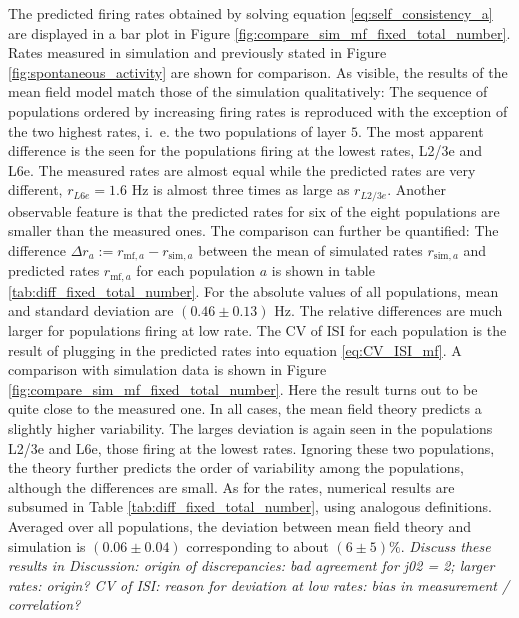 The predicted firing rates obtained by solving equation 
\eqref{eq:self_consistency_a} are displayed in a bar plot in Figure 
\ref{fig:compare_sim_mf_fixed_total_number}. Rates measured in 
simulation and previously stated in Figure \ref{fig:spontaneous_activity}
are shown for comparison. As visible, the results of the mean field model 
match those of the simulation qualitatively: The sequence of populations 
ordered by increasing firing rates is reproduced with the exception of
the two highest rates, i.~e. the two populations of layer $5$. 
The most apparent difference is the seen for the populations firing at the lowest 
rates, L2/3e  and L6e. The measured rates are almost equal while the 
predicted rates are very different, $r_{L6e} = 1.6$ Hz is almost three times 
as large as $r_{L2/3e}$. Another observable feature is that the predicted rates
for six of the eight populations are smaller than the measured ones. 
The comparison can further be quantified: The difference 
$    \Delta r_a := r_{\text{mf}, a} - r_{\text{sim}, a} $
between the mean of simulated rates $r_{\text{sim}, a}$ and predicted rates 
$r_{\text{mf}, a}$ for each population $a$ is shown in table \ref{tab:diff_fixed_total_number}. 
For the absolute values of all populations, mean and standard 
deviation are $(0.46 \pm  0.13)$ Hz. The relative differences 
are much larger for populations firing at low rate.  
The CV of ISI for each population is the result of plugging in the predicted rates 
into equation \eqref{eq:CV_ISI_mf}. A comparison with simulation data is shown
in Figure \ref{fig:compare_sim_mf_fixed_total_number}. Here the result turns out 
to be quite close to the measured one. In all cases, the mean field theory predicts 
a slightly higher variability. The larges deviation is again seen in the populations 
L2/3e and L6e, those firing at the lowest rates. Ignoring these two populations, 
the theory further predicts the order of variability among the populations, although
the differences are small. As for the rates, numerical results are subsumed in 
Table \ref{tab:diff_fixed_total_number}, using analogous definitions. 
Averaged over all populations, the deviation between mean field theory and simulation
is $(0.06 \pm 0.04)$ corresponding to about $(6 \pm 5) \%$. 
\emph{
    Discuss these results in Discussion: origin of discrepancies:
    bad agreement for j02 = 2; larger rates: origin?
    CV of ISI: reason for deviation at low rates: bias in measurement / correlation?
}

